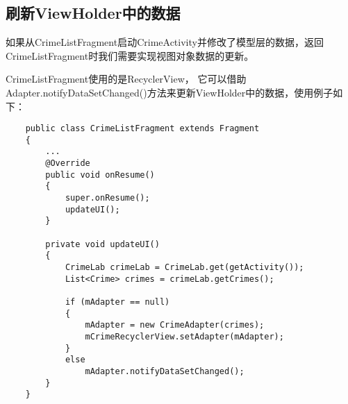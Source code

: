 \documentclass[a4paper,left=2.5cm,right=2.5cm,11pt]{article}
\begin{document}
\subsection{刷新ViewHolder中的数据}
	如果从CrimeListFragment启动CrimeActivity并修改了模型层的数据，返回CrimeListFragment时我们需要实现视图对象数据的更新。\par

	CrimeListFragment使用的是RecyclerView，
	它可以借助Adapter.notifyDataSetChanged()方法来更新ViewHolder中的数据，使用例子如下：
	\begin{lstlisting}
	public class CrimeListFragment extends Fragment
	{
		...
		@Override
		public void onResume()
		{
			super.onResume();
			updateUI();
		}

		private void updateUI()
		{
			CrimeLab crimeLab = CrimeLab.get(getActivity());
			List<Crime> crimes = crimeLab.getCrimes();

			if (mAdapter == null)
			{
				mAdapter = new CrimeAdapter(crimes);
				mCrimeRecyclerView.setAdapter(mAdapter);
			}
			else
				mAdapter.notifyDataSetChanged();
		}
	}
	\end{lstlisting}
\end{document}
